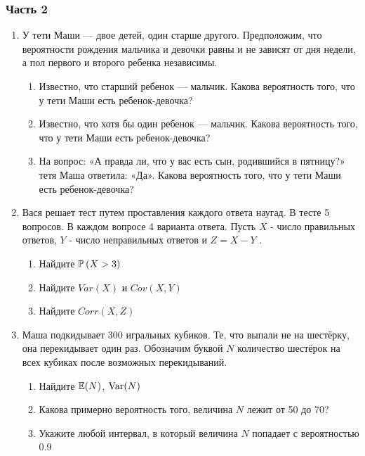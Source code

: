 \documentclass[12pt, a4paper]{article}\usepackage[]{graphicx}\usepackage[]{color}
\begin{document}
\subsubsection*{Часть 2}

\begin{enumerate}

\item У тети Маши — двое детей, один старше другого. Предположим, что вероятности рождения мальчика и девочки равны и не зависят от дня недели, а пол первого и второго ребенка независимы.
\begin{enumerate}
\item Известно, что старший ребенок — мальчик. Какова
вероятность того, что у тети Маши есть ребенок-девочка?
\item Известно, что хотя бы один ребенок — мальчик. Какова
вероятность того, что у тети Маши есть ребенок-девочка?
\item На вопрос: «А правда ли, что у вас есть сын, родившийся в пятницу?» тетя Маша ответила: «Да». Какова
вероятность того, что у тети Маши есть ребенок-девочка?
\end{enumerate}


\item Вася решает тест путем проставления каждого ответа наугад. В тесте 5 вопросов. В каждом вопросе 4 варианта ответа. Пусть  $X$  - число правильных ответов,  $Y$  - число неправильных ответов и  $Z=X-Y$ .

\begin{enumerate}
\item Найдите  $\P\left(X>3\right)$

\item Найдите  $Var\left(X\right)$  и  $Cov\left(X,Y\right)$

\item Найдите  $Corr\left(X,Z\right)$
\end{enumerate}


\item Маша подкидывает 300 игральных кубиков. Те, что выпали не на шестёрку, она перекидывает один раз. Обозначим буквой $N$ количество шестёрок на всех кубиках после возможных перекидываний.
\begin{enumerate}
\item Найдите $\E(N)$, $\Var(N)$
\item Какова примерно вероятность того, величина $N$ лежит от 50 до 70?
\item Укажите любой интервал, в который величина $N$ попадает с вероятностью 0.9
\end{enumerate}

\end{enumerate}
\end{document}
